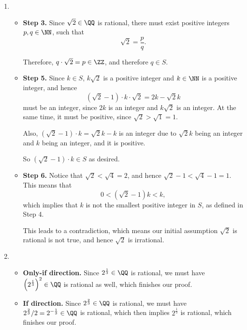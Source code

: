 \Question{\currfilebase}

\begin{enumerate}
    \item \begin{itemize}
              \item \textbf{Step 3.} Since \(\sqrt{2} \in \QQ\) is rational, there must exist positive integers \(p, q \in \NN\), such that
                    \[
                        \sqrt{2} = \frac{p}{q}.
                    \]

                    Therefore, \(q \cdot \sqrt{2} = p \in \ZZ\), and therefore \(q \in S\).

              \item \textbf{Step 5.} Since \(k \in S\), \(k\sqrt{2}\) is a positive integer and \(k \in \NN\) is a positive integer, and hence
                    \[
                        (\sqrt{2} - 1) \cdot k \cdot \sqrt{2} = 2k - \sqrt{2}k
                    \]
                    must be an integer, since \(2k\) is an integer and \(k \sqrt{2}\) is an integer. At the same time, it must be positive, since \(\sqrt{2} > \sqrt{1} = 1\).

                    Also, \((\sqrt{2} - 1) \cdot k = \sqrt{2} k - k\) is an integer due to \(\sqrt{2}k\) being an integer and \(k\) being an integer, and it is positive.

                    So \((\sqrt{2} - 1) \cdot k \in S\) as desired.

              \item \textbf{Step 6.} Notice that \(\sqrt{2} < \sqrt{4} = 2\), and hence \(\sqrt{2} - 1 < \sqrt{4} - 1 = 1\). This means that
                    \[
                        0 < (\sqrt{2} - 1)k < k,
                    \]
                    which implies that \(k\) is not the smallest positive integer in \(S\), as defined in Step 4.

                    This leads to a contradiction, which means our initial assumption \(\sqrt{2}\) is rational is not true, and hence \(\sqrt{2}\) is irrational.
          \end{itemize}

    \item \begin{itemize}
              \item \textbf{Only-if direction.} Since \(2^{\frac{1}{3}} \in \QQ\) is rational, we must have \(\left(2^{\frac{1}{3}}\right)^2 \in \QQ\) is rational as well, which finishes our proof.
              \item \textbf{If direction.} Since \(2^{\frac{2}{3}} \in \QQ\) is rational, we must have \(2^{\frac{2}{3}} / 2 = 2^{-\frac{1}{3}} \in \QQ\) is rational, which then implies \(2^{\frac{1}{3}}\) is rational, which finishes our proof.
          \end{itemize}


\end{enumerate}
